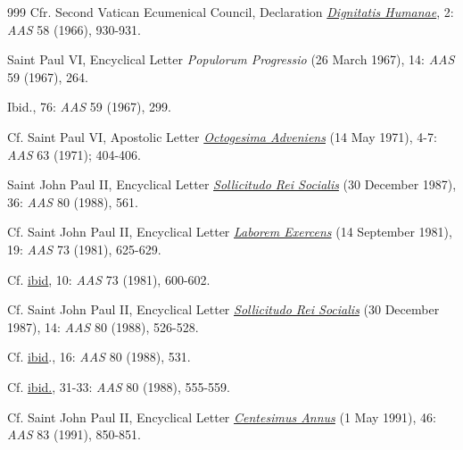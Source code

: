 \documentclass{article}
\begin{document}
\begin{thebibliography}{999}
 Cfr. Second Vatican Ecumenical Council, Declaration \href{https://www.vatican.va/archive/hist_councils/ii_vatican_council/documents/vat-ii_decl_19651207_dignitatis-humanae_en.html}{\emph{Dignitatis Humanae}}, 2: \emph{AAS} 58 (1966), 930-931.

 Saint Paul VI, Encyclical Letter \emph{Populorum Progressio} (26 March 1967), 14: \emph{AAS} 59 (1967), 264.

 Ibid., 76: \emph{AAS} 59 (1967), 299.

 Cf. Saint Paul VI, Apostolic Letter \href{https://www.vatican.va/content/paul-vi/en/apost_letters/documents/hf_p-vi_apl_19710514_octogesima-adveniens.html}{\emph{Octogesima Adveniens}} (14 May 1971), 4-7: \emph{AAS} 63 (1971); 404-406.

 Saint John Paul II, Encyclical Letter \href{https://www.vatican.va/content/john-paul-ii/en/encyclicals/documents/hf_jp-ii_enc_30121987_sollicitudo-rei-socialis.html}{\emph{Sollicitudo Rei Socialis}} (30 December 1987), 36: \emph{AAS} 80 (1988), 561.

 Cf. Saint John Paul II, Encyclical Letter \href{https://www.vatican.va/content/john-paul-ii/en/encyclicals/documents/hf_jp-ii_enc_14091981_laborem-exercens.html}{\emph{Laborem Exercens}} (14 September 1981), 19: \emph{AAS} 73 (1981), 625-629.

 Cf. \href{https://www.vatican.va/content/john-paul-ii/en/encyclicals/documents/hf_jp-ii_enc_14091981_laborem-exercens.html}{ibid}, 10: \emph{AAS} 73 (1981), 600-602.

 Cf. Saint John Paul II, Encyclical Letter \href{https://www.vatican.va/content/john-paul-ii/en/encyclicals/documents/hf_jp-ii_enc_30121987_sollicitudo-rei-socialis.html}{\emph{Sollicitudo Rei Socialis}} (30 December 1987), 14: \emph{AAS} 80 (1988), 526-528.

 Cf. \href{https://www.vatican.va/content/john-paul-ii/en/encyclicals/documents/hf_jp-ii_enc_30121987_sollicitudo-rei-socialis.html}{ibid}., 16: \emph{AAS} 80 (1988), 531.

 Cf. \href{https://www.vatican.va/content/john-paul-ii/en/encyclicals/documents/hf_jp-ii_enc_30121987_sollicitudo-rei-socialis.html}{ibid.}, 31-33: \emph{AAS} 80 (1988), 555-559.

 Cf. Saint John Paul II, Encyclical Letter \href{https://www.vatican.va/content/john-paul-ii/en/encyclicals/documents/hf_jp-ii_enc_01051991_centesimus-annus.html}{\emph{Centesimus Annus}} (1 May 1991), 46: \emph{AAS} 83 (1991), 850-851.


\end{thebibliography}
\end{document}
